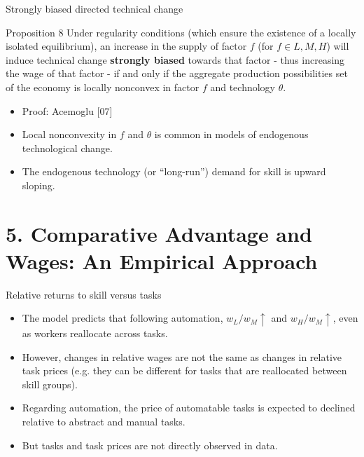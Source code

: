 \documentclass[notes=show]{beamer}
\begin{document}
\begin{frame}{Strongly biased directed technical change}
\begin{block}{Proposition 8}
Under regularity conditions (which ensure the existence of a locally isolated equilibrium), an increase in the supply of factor $f$ (for $f \in {L,M,H}$) will induce technical change \textbf{strongly biased} towards that factor - thus increasing the wage of that factor - if and only if the aggregate production possibilities set of the economy is locally nonconvex in factor $f$ and technology $\theta$.
\end{block}
\begin{itemize}
\item Proof: Acemoglu [07] \smallskip
\item Local nonconvexity in $f$ and $ \theta$ is common in models of endogenous technological change. \smallskip
\item The endogenous technology (or ``long-run'') demand for skill is upward sloping.
\end{itemize}
\end{frame}

\section{5. Comparative Advantage and Wages: An Empirical Approach}

\begin{frame}{Relative returns to skill versus tasks}
\begin{itemize}
\item The model predicts that following automation, $w_{L}/w_{M} \uparrow $ and $w_{H}/w_{M} \uparrow $, even as workers reallocate across tasks. \medskip
\item However, changes in relative wages are not the same as changes in relative task prices (e.g. they can be different for tasks that are reallocated between skill groups). \medskip
\item Regarding automation, the price of automatable tasks is expected to declined relative to abstract and manual tasks. \medskip
\item But tasks and task prices are not directly observed in data.
\end{itemize}
\end{frame}
\end{document}
